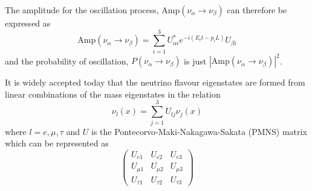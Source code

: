 The amplitude for the oscillation process, $\text{Amp}(\nu_{\alpha} \rightarrow \nu_{\beta})$ can therefore be expressed as
\begin{equation}
  \text{Amp}(\nu_{\alpha} \rightarrow \nu_{\beta}) = \sum_{i=1}^{3} U^{*}_{\alpha i} e^{-i (E_{i}t - p_{i}L) } U_{\beta i} 
\end{equation}
and the probability of oscillation, $P(\nu_{\alpha} \rightarrow \nu_{\beta})$ is just $|\text{Amp}(\nu_{\alpha} \rightarrow \nu_{\beta})|^{2}$.

It is widely accepted today that the neutrino flavour eigenstates are formed from linear combinations of the mass eigenstates in the relation
\begin{equation} 
  \nu_{l}(x) = \sum_{j=1}^{3} U_{lj} \nu_{j}(x)
  \label{eq:massFlavSuper}
\end{equation}
where $l = e, \mu, \tau$ and $U$ is the Pontecorvo-Maki-Nakagawa-Sakata (PMNS) matrix which can be represented as
\begin{equation}
  \begin{pmatrix}
    U_{e1}     & U_{e2}     & U_{e3} \\
    U_{\mu 1}  & U_{\mu 2}  & U_{\mu 3} \\
    U_{\tau 1} & U_{\tau 2} & U_{\tau 3}
  \end{pmatrix}
\end{equation}

